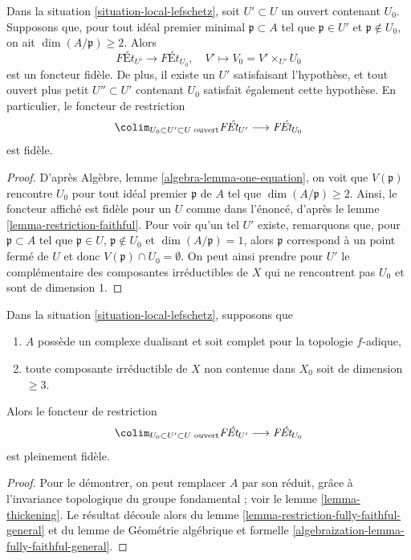 \begin{lemma}
\label{lemma-faithful-general}
Dans la situation \ref{situation-local-lefschetz}, soit $U' \subset U$
un ouvert contenant $U_0$. Supposons que, pour tout idéal premier minimal $\mathfrak p \subset A$
tel que $\mathfrak p \in U'$ et $\mathfrak p \not \in U_0$, on ait
$\dim(A/\mathfrak p) \geq 2$. Alors
$$
\textit{F\'Et}_{U'} \longrightarrow \textit{F\'Et}_{U_0},\quad
V' \longmapsto V_0 = V' \times_{U'} U_0
$$
est un foncteur fidèle. De plus, il existe un $U'$ satisfaisant
l'hypothèse, et tout ouvert plus petit $U'' \subset U'$ contenant
$U_0$ satisfait également cette hypothèse. En particulier, le
foncteur de restriction
$$
\colim_{U_0 \subset U' \subset U\text{ ouvert}} \textit{F\'Et}_{U'}
\longrightarrow
\textit{F\'Et}_{U_0}
$$
est fidèle.
\end{lemma}

\begin{proof}
D'après Algèbre, lemme \ref{algebra-lemma-one-equation},
on voit que $V(\mathfrak p)$ rencontre $U_0$ pour
tout idéal premier $\mathfrak p$ de $A$ tel que $\dim(A/\mathfrak p) \geq 2$.
Ainsi, le foncteur affiché est fidèle pour un $U$ comme dans l'énoncé,
d'après le lemme \ref{lemma-restriction-faithful}.
Pour voir qu'un tel $U'$ existe, remarquons que, pour
$\mathfrak p \subset A$ tel que $\mathfrak p \in U$,
$\mathfrak p \not \in U_0$ et $\dim(A/\mathfrak p) = 1$,
alors $\mathfrak p$ correspond à un point fermé de $U$
et donc $V(\mathfrak p) \cap U_0 = \emptyset$.
On peut ainsi prendre pour $U'$ le complémentaire des composantes
irréductibles de $X$ qui ne rencontrent pas $U_0$ et sont de dimension $1$.
\end{proof}

\begin{lemma}
\label{lemma-fully-faithful-general-better}
Dans la situation \ref{situation-local-lefschetz}, supposons que
\begin{enumerate}
\item $A$ possède un complexe dualisant et soit complet pour la topologie $f$-adique,
\item toute composante irréductible de $X$ non contenue dans $X_0$
soit de dimension $\geq 3$.
\end{enumerate}
Alors le foncteur de restriction
$$
\colim_{U_0 \subset U' \subset U\text{ ouvert}} \textit{F\'Et}_{U'}
\longrightarrow
\textit{F\'Et}_{U_0}
$$
est pleinement fidèle.
\end{lemma}

\begin{proof}
Pour le démontrer, on peut remplacer $A$ par son réduit, grâce à l'invariance topologique
du groupe fondamental ; voir le lemme \ref{lemma-thickening}.
Le résultat découle alors du
lemme \ref{lemma-restriction-fully-faithful-general}
et du lemme de Géométrie algébrique et formelle
\ref{algebraization-lemma-fully-faithful-general}.
\end{proof}

